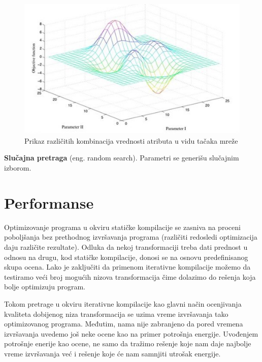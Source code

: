 \documentclass[a4paper]{article}
\begin{document}
\begin{figure}[h]
\includegraphics[scale=0.75]{grid.png}
\caption{Prikaz različitih kombinacija vrednosti atributa u vidu tačaka mreže}
\label{fig:slika1}
\end{figure}

\textbf{Slučajna pretraga} (eng. random search). Parametri se generišu slučajnim izborom.

\section{Performanse}
\label{sec:performanse}
Optimizovanje programa u okviru statičke kompilacije se zasniva na proceni poboljšanja 
bez prethodnog izvršavanja programa (različiti redosledi optimizacija daju različite rezultate). 
Odluka da nekoj transformaciji treba dati prednost u odnosu na drugu, kod statičke kompilacije,
donosi se na osnovu predefinisanog skupa ocena. Lako je zaključiti da primenom iterativne kompilacije 
možemo da testiramo veći broj mogućih nizova transformacija čime dolazimo do rešenja koja bolje optimizuju
program. 

\par
Tokom pretrage u okviru iterativne kompilacije kao glavni način ocenjivanja kvaliteta dobijenog niza transformacija
 se uzima vreme izvršavanja tako optimizovanog programa. Međutim, nama nije zabranjeno da pored vremena izvršavanja
 uvedemo još neke ocene kao na primer potrošnja energije. Uvođenjem potrošnje enerije kao ocene, ne samo da tražimo
 rešenje koje nam daje najbolje vreme izvršavanja već i rešenje koje će nam samnjiti utrošak energije.
\end{document}
